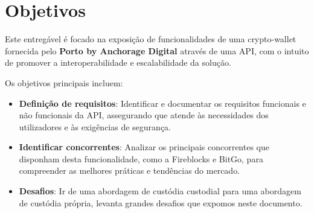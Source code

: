 \newpage
\thispagestyle{otherpages}
\section{Objetivos}
Este entregável é focado na exposição de funcionalidades de uma crypto-wallet fornecida pelo \textbf{Porto by Anchorage Digital} através de uma API, com o intuito de promover a interoperabilidade e escalabilidade da solução.

Os objetivos principais incluem:
\begin{itemize}
    \item \textbf{Definição de requisitos}: Identificar e documentar os requisitos funcionais e não funcionais da API, assegurando que atende às necessidades dos utilizadores e às exigências de segurança.
    \item \textbf{Identificar concorrentes}: Analizar os principais concorrentes que disponham desta funcionalidade, como a Fireblocks e BitGo, para compreender as melhores práticas e tendências do mercado.
    \item \textbf{Desafios}: Ir de uma abordagem de custódia custodial para uma abordagem de custódia própria, levanta grandes desafios que expomos neste documento.
\end{itemize}